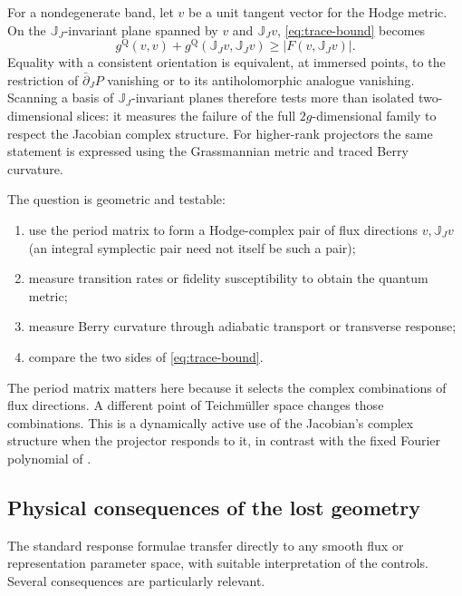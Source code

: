 \documentclass[11pt]{article}
\theoremstyle{definition}
\theoremstyle{remark}
\begin{document}
For a nondegenerate band, let \(v\) be a unit tangent vector for the Hodge
metric.  On the \(\mathbb J_J\)-invariant plane spanned by
\(v\) and \(\mathbb J_Jv\), \eqref{eq:trace-bound} becomes
\[
 g^{\mathrm Q}(v,v)
   +g^{\mathrm Q}(\mathbb J_Jv,\mathbb J_Jv)
       \geq
       \left|F(v,\mathbb J_Jv)\right|.
 \tag{7.17}\label{eq:complex-plane-bound}
\]
Equality with a consistent orientation is equivalent, at immersed points,
to the restriction of \(\bar\partial_JP\) vanishing or to its
antiholomorphic analogue vanishing.  Scanning a basis of
\(\mathbb J_J\)-invariant planes therefore tests more than isolated
two-dimensional slices: it measures the failure of the full
\(2g\)-dimensional family to respect the Jacobian complex structure.  For
higher-rank projectors the same statement is expressed using the
Grassmannian metric and traced Berry curvature.

The question is geometric and testable:

\begin{enumerate}[label=\textup{(\roman*)},leftmargin=2.6em]
\item use the period matrix to form a Hodge-complex pair of flux directions
  \(v,\mathbb J_Jv\) (an integral symplectic pair need not itself be such a
  pair);
\item measure transition rates or fidelity susceptibility to obtain the
  quantum metric;
\item measure Berry curvature through adiabatic transport or transverse
  response;
\item compare the two sides of \eqref{eq:trace-bound}.
\end{enumerate}

The period matrix matters here because it selects the complex combinations of
flux directions.  A different point of Teichm\"uller space changes those
combinations.  This is a dynamically active use of the Jacobian's complex
structure when the projector responds to it, in contrast with the fixed
Fourier polynomial of .

\subsection{Physical consequences of the lost geometry}

The standard response formulae transfer directly to any smooth flux or
representation parameter space, with suitable interpretation of the
controls.  Several consequences are particularly relevant.
\end{document}
